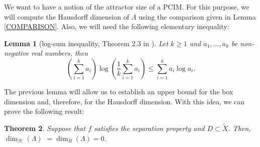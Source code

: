 \documentclass[a4paper]{article}
\newtheorem{theorem}{Theorem}[section]
\newtheorem{lemma}[theorem]{Lemma}
\begin{document}
We want to have a notion of the attractor size of a PCIM. For this purpose, we will compute the Hausdorff dimension of $\Lambda$ using the comparison given in Lemma \ref{COMPARISON}. Also, {we} will need the following elementary inequality:

\begin{lemma}[log-sum inequality, Theorem 2.3 in \cite{KOBA}]\label{LOGSUM}
    Let $k\geq1$ and $a_1,\ldots,a_k$ be non-negative real numbers, then
    \[
        \left(\sum_{i=1}^k a_i\right)\log\!\left(\frac{1}{k}\sum_{i=1}^k a_i\right)\leq \sum_{i=1}^ka_i \log a_i.
    \]
\end{lemma}

The previous lemma will allow us to establish an upper bound for the box dimension and, therefore, for the Hausdorff dimension. With this idea, we can prove the following result:

\begin{theorem}\label{DIMH0}
    Suppose that $f$ satisfies the separation property and $D\subset\widetilde X$. Then, $\dim_{\mathcal H}(\Lambda)$ $=\dim_B(\Lambda)=0$.
\end{theorem}
\end{document}
